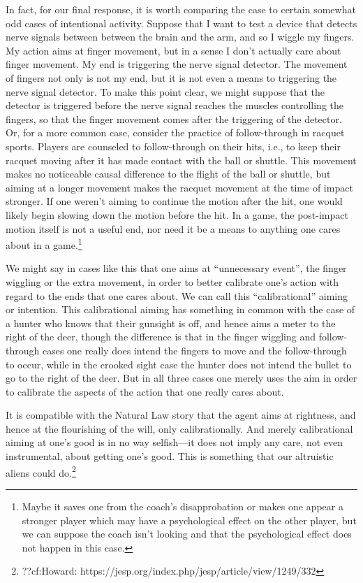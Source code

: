 In fact, for our final response, it is worth comparing the case to certain somewhat odd cases of intentional activity. Suppose that
I want to test a device that detects nerve signals between between the brain and the arm, and so I wiggle my fingers. My action aims
at finger movement, but in a sense I don't actually care about finger movement. My end is triggering the nerve signal detector.
The movement of fingers not only is not my end, but it is not even a means to triggering the nerve signal detector. To make this
point clear, we might suppose that the detector is triggered before the nerve signal reaches the muscles controlling the fingers,
so that the finger movement comes after the triggering of the detector. Or, for a more common case, consider the practice of
follow-through in racquet sports. Players are counseled to follow-through on their hits, i.e., to keep their racquet moving after 
it has made contact with the ball or shuttle. This movement makes no noticeable causal difference to the flight of the ball or 
shuttle, but aiming at a longer movement makes the racquet movement at the time of impact stronger. If one weren't aiming to continue 
the motion after the hit, one would likely begin slowing down the motion before the hit. In a game, the post-impact motion itself is not 
a useful end, nor need it be a means to anything one cares about in a game.\footnote{Maybe it saves one from the coach's 
disapprobation or makes one appear a stronger player which may have a psychological effect on the other player, but we can suppose the 
coach isn't looking and that the psychological effect does not happen in this case.} 

We might say in cases like this that one aims at ``unnecessary event'', the finger wiggling or the extra movement, in order to 
better calibrate one's action with regard to the ends that one cares about. We can call this ``calibrational'' aiming or
intention. This calibrational aiming has something in common with the case of a hunter who knows that their gunsight is off,
and hence aims a meter to the right of the deer, though the difference is that in the finger wiggling and follow-through
cases one really does intend the fingers to move and the follow-through to occur, while in the crooked sight case the hunter does
not intend the bullet to go to the right of the deer. But in all three cases one merely uses the aim in order to calibrate the 
aspects of the action that one really cares about. 

It is compatible with the Natural Law story that the agent aims at rightness, and hence at the flourishing of the will, only
calibrationally. And merely calibrational aiming at one's good is in no way selfish---it does not imply any care, not even instrumental,
about getting one's good. This is something that our altruistic aliens could do.\footnote{??cf:Howard: https://jesp.org/index.php/jesp/article/view/1249/332}

